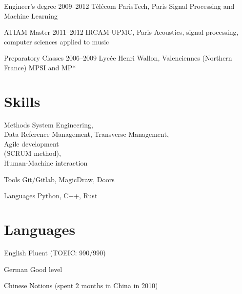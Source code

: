 \documentclass{tccv}
\begin{document}
\begin{eventlist}
\begin{yearlist}

\item[Engineer's degree]{2009--2012}
     {Télécom ParisTech, Paris}
     {Signal Processing and Machine Learning}

\item[ATIAM Master]{2011--2012}
    {IRCAM-UPMC, Paris}
    {Acoustics, signal processing, 
     computer sciences applied to music}

\item[Preparatory Classes]{2006--2009}
    {Lycée Henri Wallon, Valenciennes (Northern France)}
    {MPSI and MP*}

\end{yearlist}

\section{Skills}

\begin{factlist}

\item{Methods}
     {System Engineering, \\
      Data Reference Management, 
      Transverse Management, \\
      Agile development \\
      (SCRUM method), \\
      Human-Machine interaction}

\item{Tools}
     {Git/Gitlab, MagicDraw, Doors}
      
\item{Languages}
     {Python, C++, Rust}


\end{factlist}

\section{Languages}

\begin{factlist}

\item{English}
    {Fluent (TOEIC: 990/990)}
\item{German}
    {Good level}
\item{Chinese}
    {Notions (spent 2 months in China in 2010)}


\end{factlist}
\end{eventlist}
\end{document}
